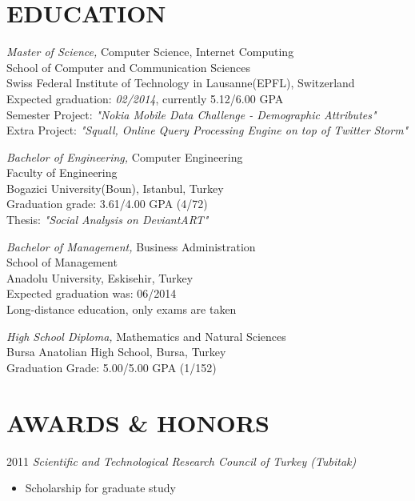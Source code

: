\documentclass[line, margin]{res}
\begin{document}
\address{Avenue de Rhodanie 64 Chambre 524, 1007 Lausanne Switzerland, (+41) 78 926 9917}
\address{\textit{ferhat.elmas@epfl.ch \hspace{6.2cm} github.com/ferhatelmas}}
 
\begin{resume}
  
\section{EDUCATION}
				{\sl Master of Science,} Computer Science, Internet Computing\\
				School of Computer and Communication Sciences \\
				Swiss Federal Institute of Technology in Lausanne(EPFL), Switzerland \\
                Expected graduation: \textit{02/2014}, currently 5.12/6.00 GPA \\
                Semester Project: \textit{"Nokia Mobile Data Challenge - Demographic Attributes"} \\
                Extra Project: \textit{"Squall, Online Query Processing Engine on top of Twitter Storm"}
 
				{\sl Bachelor of Engineering,} Computer Engineering \\
				Faculty of Engineering \\
				Bogazici University(Boun), Istanbul, Turkey \\
				Graduation grade: 3.61/4.00 GPA (4/72) \\
                Thesis: \textit{"Social Analysis on DeviantART"}
 
				{\sl Bachelor of Management,}  Business Administration \\
				School of Management \\
				Anadolu University, Eskisehir, Turkey \\          
				Expected graduation was: 06/2014 \\        
                Long-distance education, only exams are taken

				{\sl High School Diploma,} Mathematics and Natural Sciences \\
				Bursa Anatolian High School, Bursa, Turkey \\
				Graduation Grade: 5.00/5.00 GPA (1/152)               

\section{AWARDS \& HONORS}
				2011 {\sl Scientific and Technological Research Council of Turkey (Tubitak)} \\
				\vspace{-.3cm}				
				\begin{itemize}
					\item Scholarship for graduate study
				\end{itemize}
				

\end{resume}
\end{document}
